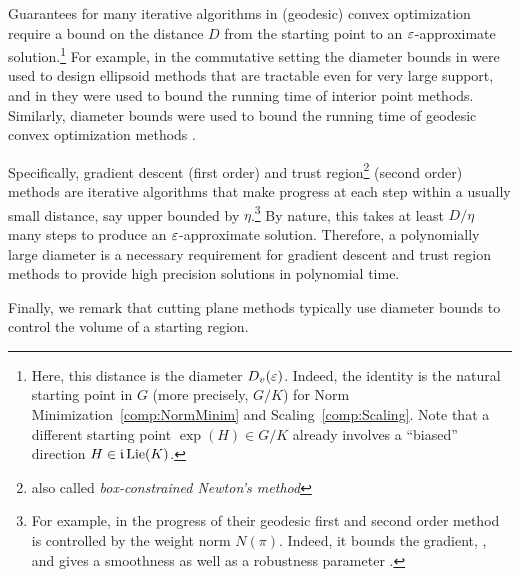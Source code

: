 Guarantees for many iterative algorithms in (geodesic) convex optimization require a bound on the distance $D$ from the starting point to an $\varepsilon$-approximate solution.\footnote{Here, this distance is the diameter $D_v(\varepsilon)$. Indeed, the identity is the natural starting point in $G$ (more precisely, $G/K$) for Norm Minimization~\ref{comp:NormMinim} and Scaling~\ref{comp:Scaling}. Note that a different starting point $\exp(H) \in G/K$ already involves a ``biased'' direction $H \in \mathfrak{i} \operatorname{Lie}(K)$.}
For example, in the commutative setting the diameter bounds in \cite{singh2014entropy,straszak2019computing} were used to design ellipsoid methods that are tractable even for very large support, and in \cite{burgisser2020interior} they were used to bound the running time of interior point methods. Similarly, diameter bounds were used to bound the running time of geodesic convex optimization methods \cite{allen2018operator, GradflowArXiv}.

Specifically, gradient descent (first order) and trust region\footnote{also called \emph{box-constrained Newton's method}} (second order) methods are iterative algorithms that make progress at each step within a usually small distance, say upper bounded by $\eta$.\footnote{For example, in \cite{GradflowArXiv} the progress of their geodesic first and second order method is controlled by the weight norm $N(\pi)$. Indeed, it bounds the gradient, \cite[Lemma~3.12]{GradflowArXiv}, and gives a smoothness as well as a robustness parameter \cite[Propositions~3.13 and~3.15]{GradflowArXiv}.}
By nature, this takes at least $D / \eta$ many steps to produce an $\varepsilon$-approximate solution.
Therefore, a polynomially large diameter is a necessary requirement for gradient descent and trust region methods to provide high precision solutions in polynomial time.

Finally, we remark that cutting plane methods typically use diameter bounds to control the volume of a starting region.




